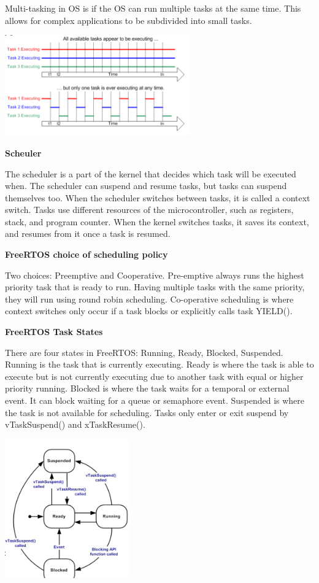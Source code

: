 Multi-tasking in OS is if the OS can run multiple tasks at the same time.
This allows for complex applications to be subdivided into small tasks.

\begin{center}
	\includegraphics[width=0.6\textwidth]{images/multitasking.png}
\end{center}

\textbf{Scheuler}

The scheduler is a part of the kernel that decides which task will be executed when.
The scheduler can suspend and resume tasks, but tasks can suspend themselves too.
When the scheduler switches between tasks, it is called a context switch.
Tasks use different resources of the microcontroller, such as registers,
stack, and program counter.
When the kernel switches tasks, it saves its context,
and resumes from it once a task is resumed.


\textbf{FreeRTOS choice of scheduling policy}

Two choices: Preemptive and Cooperative. Pre-emptive always runs the highest priority task that is ready to run.
Having multiple tasks with the same priority, they will run using round robin scheduling.
Co-operative scheduling is where context switches only occur if a task blocks or explicitly calls task YIELD().


\textbf{FreeRTOS Task States}

There are four states in FreeRTOS:
Running, Ready, Blocked, Suspended.
Running is the task that is currently executing.
Ready is where the task is able to execute but is not currently executing due to another task with equal or higher priority running.
Blocked is where the task waits for a temporal or external event. It can block waiting for a queue or semaphore event.
Suspended is where the task is not available for scheduling. Tasks only enter or exit suspend by vTaskSuspend() and xTaskResume().

\begin{center}
	\includegraphics[width=0.4\textwidth]{images/freeStates.png}
\end{center}

